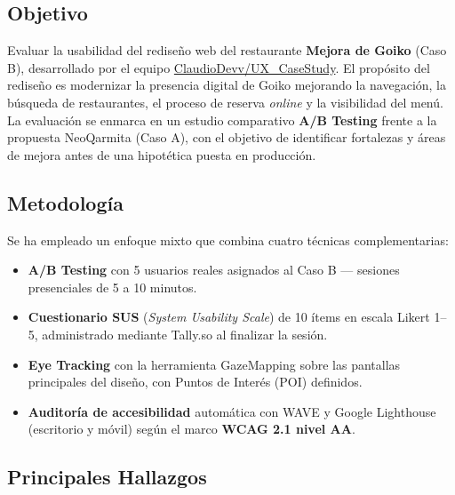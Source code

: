 \documentclass[11pt,a4paper]{article}
\begin{document}
\subsection{Objetivo}

Evaluar la usabilidad del rediseño web del restaurante \textbf{Mejora de Goiko} (Caso B),
desarrollado por el equipo
\href{https://github.com/ClaudioDevv/UX\_CaseStudy}{ClaudioDevv/UX\_CaseStudy}.
El propósito del rediseño es modernizar la presencia digital de Goiko mejorando la navegación,
la búsqueda de restaurantes, el proceso de reserva \textit{online} y la visibilidad del menú.
La evaluación se enmarca en un estudio comparativo \textbf{A/B Testing} frente a la propuesta
NeoQarmita (Caso A), con el objetivo de identificar fortalezas y áreas de mejora antes de
una hipotética puesta en producción.

\subsection{Metodología}

Se ha empleado un enfoque mixto que combina cuatro técnicas complementarias:

\begin{itemize}
  \item \textbf{A/B Testing} con 5 usuarios reales asignados al Caso B —
        sesiones presenciales de 5 a 10 minutos.
  \item \textbf{Cuestionario SUS} (\textit{System Usability Scale}) de 10 ítems
        en escala Likert 1–5, administrado mediante Tally.so al finalizar la sesión.
  \item \textbf{Eye Tracking} con la herramienta GazeMapping sobre las pantallas
        principales del diseño, con Puntos de Interés (POI) definidos.
  \item \textbf{Auditoría de accesibilidad} automática con WAVE y Google Lighthouse
        (escritorio y móvil) según el marco \textbf{WCAG 2.1 nivel AA}.
\end{itemize}

\subsection{Principales Hallazgos}
\end{document}
